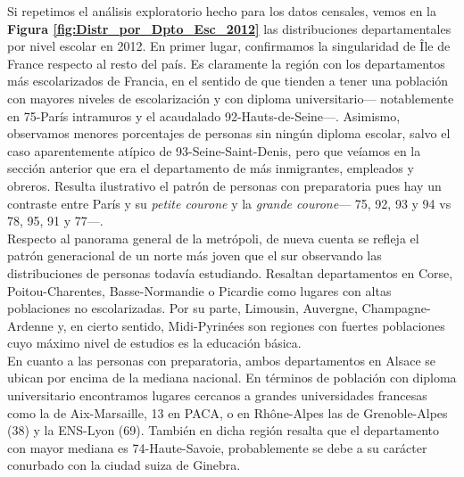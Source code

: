 Si repetimos el análisis exploratorio hecho para los datos censales, vemos en la \textbf{Figura \ref{fig:Distr_por_Dpto_Esc_2012}} las distribuciones departamentales por nivel escolar en 2012. En primer lugar, confirmamos la singularidad de Île de France respecto al resto del país. Es claramente la región con los departamentos más escolarizados de Francia, en el sentido de que tienden a tener una población con mayores niveles de escolarización y con diploma universitario--- notablemente en 75-París intramuros y el acaudalado 92-Hauts-de-Seine---. Asimismo, observamos menores porcentajes de personas sin ningún diploma escolar, salvo el caso aparentemente atípico de 93-Seine-Saint-Denis, pero que veíamos en la sección anterior que era el departamento de más inmigrantes, empleados y obreros. Resulta ilustrativo el patrón de personas con preparatoria pues hay un contraste entre París y su \textit{petite courone} y la \textit{grande courone}--- 75, 92, 93 y 94 vs 78, 95, 91 y 77---.\\ 

 Respecto al panorama general de la metrópoli, de nueva cuenta se refleja el patrón generacional de un norte más joven que el sur observando las distribuciones de personas todavía estudiando. Resaltan departamentos en Corse, Poitou-Charentes, Basse-Normandie o Picardie como lugares con altas poblaciones no escolarizadas. Por su parte, Limousin, Auvergne, Champagne-Ardenne y, en cierto sentido, Midi-Pyrinées son regiones con fuertes poblaciones cuyo máximo nivel de estudios es la educación básica.\\ 
 
 En cuanto a las personas con preparatoria, ambos departamentos en Alsace se ubican por encima de la mediana nacional. En términos de población con diploma universitario encontramos lugares cercanos a grandes universidades francesas como la de Aix-Marsaille, 13 en PACA, o en Rhône-Alpes las de Grenoble-Alpes (38) y la ENS-Lyon (69). También en dicha región resalta que el departamento con mayor mediana es 74-Haute-Savoie, probablemente se debe a su carácter conurbado con la ciudad suiza de Ginebra.\\
 
